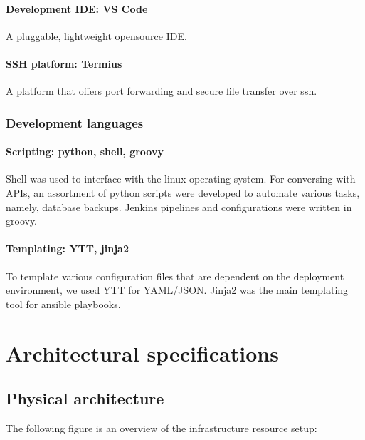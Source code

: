 \paragraph{Development IDE: VS Code }

A pluggable, lightweight opensource IDE. 

\paragraph{SSH platform: Termius }

A platform that offers port forwarding and secure file transfer over ssh. 

\subsubsection{Development languages }

\paragraph{Scripting: python\cite{Python}, shell, groovy\cite{Groovy} }

Shell was used to interface with the linux operating system. For conversing with APIs, an assortment of python scripts were developed to automate various tasks, namely, database backups. Jenkins pipelines and configurations were written in groovy. 

\paragraph{Templating: YTT\cite{YTT}, jinja2\cite{Jinja2} }

To template various configuration files that are dependent on the deployment environment, we used YTT for YAML/JSON. Jinja2 was the main templating tool for ansible playbooks. 

\section{Architectural specifications}

\subsection{Physical architecture}

The following figure is an overview of the infrastructure resource setup:

